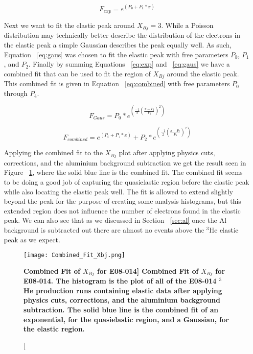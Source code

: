 \begin{equation} \label{eq:exp}
	F_{exp} = e^{\left( P_0+P_1*x \right)}
\end{equation}

Next we want to fit the elastic peak around $X_{Bj}=3$. While a Poisson distribution may technically better describe the distribution of the electrons in the elastic peak a simple Gaussian describes the peak equally well. As such, Equation ~\ref{eq:gaus} was chosen to fit the elastic peak with free parameters $P_0$, $P_1$, and $P_2$. Finally by summing Equations ~\ref{eq:exp} and ~\ref{eq:gaus} we have a combined fit that can be used to fit the region of $X_{Bj}$ around the elastic peak. This combined fit is given in Equation ~\ref{eq:combined} with free parameters $P_0$ through $P_4$.

\begin{equation} \label{eq:gaus}
	F_{Gaus} = P_0 * e^{\left( \frac{-1}{2} \left( \frac{x-P_1}{P_2} \right)^2 \right)}
\end{equation}

\begin{equation} \label{eq:combined}
	F_{combined} = e^{\left( P_0+P_1*x \right)} + P_2 * e^{\left( \frac{-1}{2} \left( \frac{x-P_3}{P_4} \right)^2 \right)}
\end{equation}

Applying the combined fit to the $X_{Bj}$ plot after applying physics cuts, corrections, and the aluminium background subtraction we get the result seen in Figure ~\ref{fig:combined}, where the solid blue line is the combined fit. The combined fit seems to be doing a good job of capturing the quasielastic region before the elastic peak while also locating the elastic peak well. The fit is allowed to extend slightly beyond the peak for the purpose of creating some analysis histograms, but this extended region does not influence the number of electrons found in the elastic peak. We can also see that as we discussed in Section ~\ref{sec:al} once the Al background is subtracted out there are almost no events above the $^3$He elastic peak as we expect. 

\begin{figure}[!ht]
\begin{center}
\texttt{[image: Combined\_Fit\_Xbj.png]}
\end{center}
\caption[\bf{Combined Fit of $X_{Bj}$ for E08-014}]{
{\bf{Combined Fit of $X_{Bj}$ for E08-014.}} The histogram is the plot of all of the E08-014 $^3$He production runs containing elastic data after applying physics cuts, corrections, and the aluminium background subtraction. The solid blue line is the combined fit of an exponential, for the quasielastic region, and a Gaussian, for the elastic region.}
\label{fig:combined}
\end{figure}

